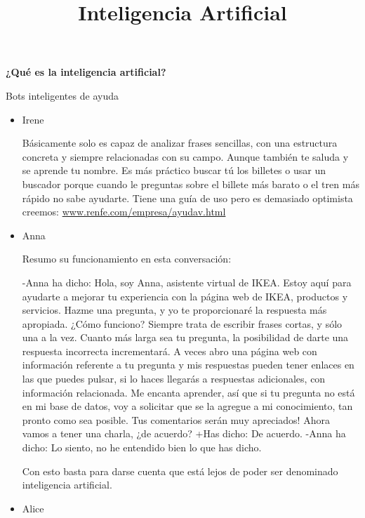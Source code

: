 \documentclass[spanish, a4paper, 12pt]{article} 	%
\begin{document}
\title{\textbf{Inteligencia Artificial}}
\maketitle



\newpage
\textbf{{¿Qué es la inteligencia artificial?}}


\begin{section}{Bots inteligentes de ayuda}

	\begin{itemize}
	
	\item{Irene}
	
	Básicamente solo es capaz de analizar frases sencillas, con una estructura concreta y siempre relacionadas con su campo.
	 Aunque también te saluda y se aprende tu nombre. Es más práctico buscar tú los billetes o usar un buscador porque 
	 cuando le preguntas sobre el billete más barato o el tren más rápido no sabe ayudarte.
	 Tiene una guía de uso pero es demasiado optimista creemos: \url{www.renfe.com/empresa/ayudav.html}
	 
	\item{Anna}
	
	Resumo su funcionamiento en esta conversación:
	
	-Anna ha dicho: Hola, soy Anna, asistente virtual de IKEA. Estoy aquí para ayudarte a mejorar tu experiencia con la página 		web de IKEA, productos y servicios. Hazme una pregunta, y yo te proporcionaré la respuesta más apropiada. 
¿Cómo funciono? Siempre trata de escribir frases cortas, y sólo una a la vez. Cuanto más larga sea tu pregunta, la posibilidad de darte una respuesta incorrecta incrementará. A veces abro una página web con información referente a tu pregunta y mis respuestas pueden tener enlaces en las que puedes pulsar, si lo haces llegarás a respuestas adicionales, con información relacionada. Me encanta aprender, así que si tu pregunta no está en mi base de datos, voy a solicitar que se la agregue a mi conocimiento, tan pronto como sea posible. Tus comentarios serán muy apreciados! Ahora vamos a tener una charla, ¿de acuerdo?
	+Has dicho: De acuerdo.
	-Anna ha dicho: Lo siento, no he entendido bien lo que has dicho.
	
	Con esto basta para darse cuenta que está lejos de poder ser denominado inteligencia artificial.
		\item{Alice}
		

\end{itemize}
\end{section}
\end{document}
